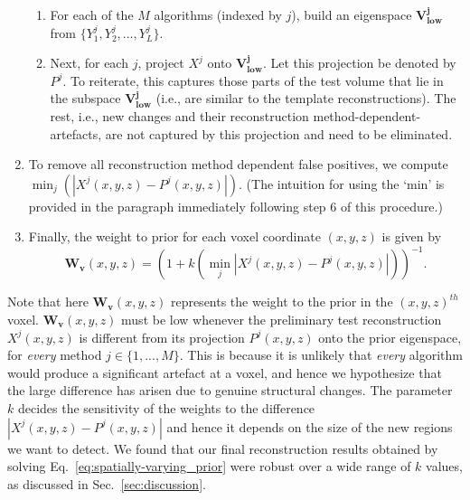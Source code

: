 \documentclass[journal]{IEEEtran}
\begin{document}
\begin{enumerate}
\begin{enumerate}
  \item For each of the $M$ algorithms (indexed by $j$), build an eigenspace $\boldsymbol{V_\text{low}^j}$ from $\{Y_1^j,Y_2^j, \ldots, Y_{L}^j\}$. %

  \item Next, for each $j$,  project $X^j$  onto $\boldsymbol{V_\text{low}^j}$. Let this projection be denoted by $P^j$. To reiterate, this captures those parts of the test volume that lie in the subspace $\boldsymbol{V_\text{low}^j}$ (i.e., are similar to the template reconstructions). The rest, i.e., new changes and their reconstruction method-dependent-artefacts, are not captured by this projection and need to be eliminated.
  \end{enumerate}
\item To remove all reconstruction method dependent false positives, we compute $\min_{j}(|X^j(x,y,z) - P^j(x,y,z)|)$. (The intuition for using the `min' is provided in the paragraph immediately following step 6 of this procedure.)
\item Finally, the weight to prior for each voxel coordinate $(x,y,z)$ is given by
  \begin{equation} 
    \boldsymbol{W_v}(x,y,z) = (1+k(\min_{j}|X^j(x,y,z) - P^j(x,y,z)|))^{-1}.
    \label{eq:weightsEq}
  \end{equation}
\end{enumerate}
\vspace{0.01mm}
Note that here $\boldsymbol{W_v}(x,y,z)$ represents the weight to the prior in the $(x,y,z)^{th}$ voxel. $\boldsymbol{W_v}(x,y,z)$ must be
low whenever the preliminary test reconstruction $X^j(x,y,z)$ is different from its projection $P^j(x,y,z)$ onto the prior eigenspace, for \emph{every} method $j \in \{1,...,M\}$. This is
because it is unlikely that \emph{every} algorithm would produce a significant artefact at a voxel, and hence we hypothesize that the large difference has arisen due to genuine structural changes. The parameter $k$ decides the sensitivity of the weights to the difference $|X^j(x,y,z) - P^j(x,y,z)|$ and hence it depends on the size of the new regions we want to detect.  
We found that our final reconstruction results obtained by
solving Eq.~\ref{eq:spatially-varying_prior} were robust over a wide range of $k$ values, as discussed in Sec.~\ref{sec:discussion}.\\
\end{document}
